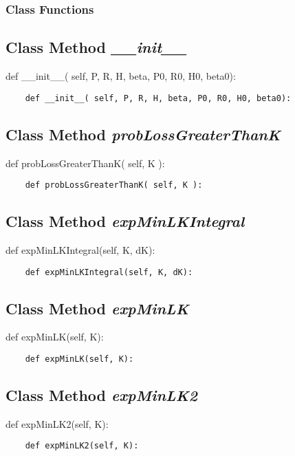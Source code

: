 \documentclass[twoside,11pt]{book}
\begin{document}
\subsubsection{Class Functions}

\subsection{Class Method {\it \_\_init\_\_}}
def \_\_init\_\_( self, P, R, H, beta, P0, R0, H0, beta0):

\begin{lstlisting}
    def __init__( self, P, R, H, beta, P0, R0, H0, beta0):
\end{lstlisting}

\subsection{Class Method {\it probLossGreaterThanK}}
def probLossGreaterThanK( self, K ):

\begin{lstlisting}
    def probLossGreaterThanK( self, K ):
\end{lstlisting}

\subsection{Class Method {\it expMinLKIntegral}}
def expMinLKIntegral(self, K, dK):

\begin{lstlisting}
    def expMinLKIntegral(self, K, dK):
\end{lstlisting}

\subsection{Class Method {\it expMinLK}}
def expMinLK(self, K):

\begin{lstlisting}
    def expMinLK(self, K):
\end{lstlisting}

\subsection{Class Method {\it expMinLK2}}
def expMinLK2(self, K):

\begin{lstlisting}
    def expMinLK2(self, K):
\end{lstlisting}
\end{document}
